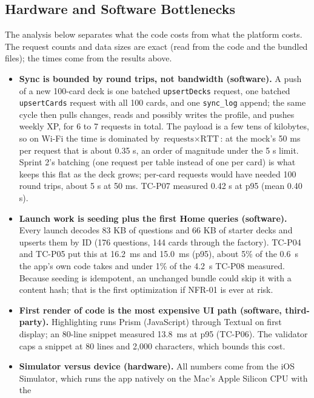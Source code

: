 \documentclass[12pt,letterpaper]{article}
\begin{document}
\subsection{Hardware and Software Bottlenecks}\label{sec:bottlenecks}
The analysis below separates what the code costs from what the platform costs. The
request counts and data sizes are exact (read from the code and the bundled files);
the times come from the results above.
\begin{itemize}
  \item \textbf{Sync is bounded by round trips, not bandwidth (software).} A push of a
        new 100-card deck is one batched \texttt{upsertDecks} request, one batched
        \texttt{upsertCards} request with all 100 cards, and one \texttt{sync\_log}
        append; the same cycle then pulls changes, reads and possibly writes the
        profile, and pushes weekly XP, for 6 to 7 requests in total. The payload is a
        few tens of kilobytes, so on Wi-Fi the time is dominated by
        $\text{requests} \times \text{RTT}$: at the mock's 50 ms per request that is
        about 0.35 s, an order of magnitude under the 5 s limit. Sprint 2's batching
        (one request per table instead of one per card) is what keeps this flat as the
        deck grows; per-card requests would have needed 100 round trips, about 5 s at
        50 ms. TC-P07 measured 0.42 s at p95 (mean 0.40 s).
  \item \textbf{Launch work is seeding plus the first Home queries (software).} Every
        launch decodes 83 KB of questions and 66 KB of starter decks and upserts them
        by ID (176 questions, 144 cards through the factory). TC-P04 and TC-P05 put
        this at 16.2~ms and 15.0~ms (p95), about 5\% of the 0.6~s the app's own code
        takes and under 1\% of the 4.2~s TC-P08 measured. Because seeding is idempotent, an unchanged bundle could
        skip it with a content hash; that is the first optimization if NFR-01 is ever
        at risk.
  \item \textbf{First render of code is the most expensive UI path (software,
        third-party).} Highlighting runs Prism (JavaScript) through Textual on first
        display; an 80-line snippet measured 13.8~ms at p95 (TC-P06). The validator caps a
        snippet at 80 lines and 2,000 characters, which bounds this cost.
  \item \textbf{Simulator versus device (hardware).} All numbers come from the iOS
        Simulator, which runs the app natively on the Mac's Apple Silicon CPU with the

\end{itemize}
\end{document}
